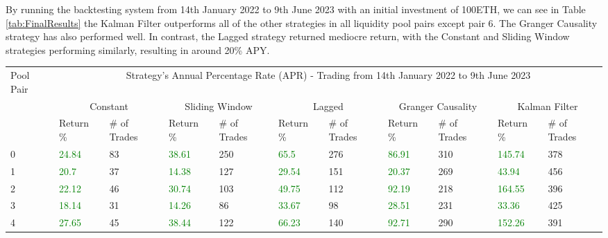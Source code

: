 \noindent By running the backtesting system from 14th January 2022 to 9th June 2023 with an initial investment of 100ETH, we can see in Table \ref{tab:FinalResults} the Kalman Filter outperforms all of the other strategies in all liquidity pool pairs except pair 6. The Granger Causality strategy has also performed well. In contrast, the Lagged strategy returned mediocre return, with the Constant and Sliding Window strategies performing similarly, resulting in around 20\% APY.
\\[3mm]
\begin{table}[H]
    \centering
    \begin{adjustwidth}{-0.8in}{-0.9in}
        \begin{tabular}{|p{4em}|p{3em}|p{3em}|p{3em}|p{3em}|p{3em}|p{3em}|p{3em}|p{3em}|p{3em}|p{3em}|}\hline
            Pool Pair & \multicolumn{10}{|c|}{Strategy's Annual Percentage Rate (APR) - Trading from 14th January 2022 to 9th June 2023} \\\cline{2-11}
            & \multicolumn{2}{|c|}{Constant} & \multicolumn{2}{|c|}{Sliding Window} & \multicolumn{2}{|c|}{Lagged} & \multicolumn{2}{|c|}{Granger Causality} & \multicolumn{2}{|c|}{Kalman Filter}\\\cline{2-11}
            & Return \% & \# of Trades & Return \% & \# of Trades & Return \% & \# of Trades & Return \% & \# of Trades & Return \% & \# of Trades\\\hline
            0 & \textcolor{green}{24.84} & 83 & \textcolor{green}{38.61} & 250 & \textcolor{green}{65.5} & 276 & \textcolor{green}{86.91} & 310 & \textcolor{green}{145.74} & 378\\\cline{2-11}
            1 & \textcolor{green}{20.7} & 37 & \textcolor{green}{14.38} & 127 & \textcolor{green}{29.54} & 151 & \textcolor{green}{20.37} & 269 & \textcolor{green}{43.94} & 456\\\cline{2-11}
            2 & \textcolor{green}{22.12} & 46 & \textcolor{green}{30.74} & 103 & \textcolor{green}{49.75} & 112 & \textcolor{green}{92.19} & 218 & \textcolor{green}{164.55} & 396\\\cline{2-11}
            3 & \textcolor{green}{18.14} & 31 & \textcolor{green}{14.26} & 86 & \textcolor{green}{33.67} & 98 & \textcolor{green}{28.51} & 231 & \textcolor{green}{33.36} & 425\\\cline{2-11}
            4 & \textcolor{green}{27.65} & 45 & \textcolor{green}{38.44} & 122 & \textcolor{green}{66.23} & 140 & \textcolor{green}{92.71} & 290 & \textcolor{green}{152.26} & 391\\\cline{2-11}

\end{tabular}
\end{adjustwidth}
\end{table}
